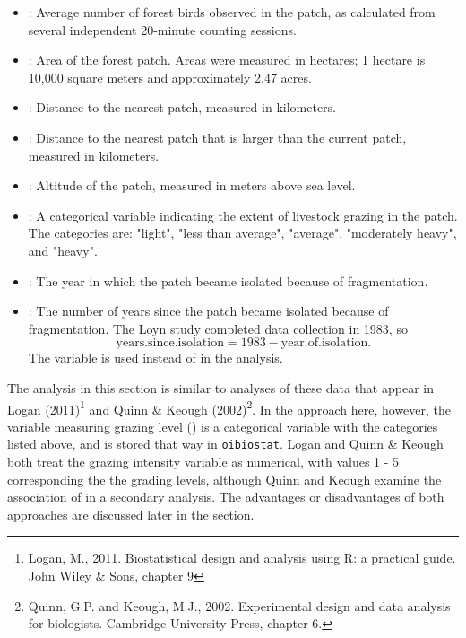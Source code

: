 \begin{itemize}

  \item {}:  Average number of forest birds observed in the patch, as calculated from several independent 20-minute counting sessions. 

  \item {}:  Area of the forest patch. Areas were measured in hectares; 1 hectare is 10,000 square meters and approximately 2.47 acres.

  \item {}: Distance to the nearest patch, measured in kilometers.

  \item {}: Distance to the nearest patch that is larger than the current patch, measured in kilometers.

  \item {}: Altitude of the patch, measured in meters above sea level.

  \item {}: A categorical variable indicating the extent of livestock grazing in the patch. The categories are: "light", "less than average", "average", "moderately heavy", and "heavy". 

  \item {}: The year in which the patch became isolated because of fragmentation.

  \item {}: The number of years since the patch became isolated because of fragmentation.  The Loyn study completed data collection in 1983, so 
  \[
     \text{years.since.isolation} = 1983 - \text{year.of.isolation}.
  \] 
The variable  is used instead of  in the analysis.

\end{itemize}

 
The analysis in this section is similar to analyses of these data that appear in Logan (2011)\footnote{Logan, M., 2011. Biostatistical design and analysis using R: a practical guide. John Wiley \& Sons, chapter 9} and Quinn \& Keough (2002)\footnote{Quinn, G.P. and Keough, M.J., 2002. Experimental design and data analysis for biologists. Cambridge University Press, chapter 6.}.  In the approach here, however, the variable measuring grazing level () is a categorical variable with the categories listed above, and is stored that way in \texttt{oibiostat}.  Logan and Quinn \& Keough both treat the grazing intensity variable as numerical, with values 1 - 5 corresponding the the grading levels, although Quinn and Keough examine the association of  in a secondary analysis. The advantages or disadvantages of both approaches are discussed later in the section.

